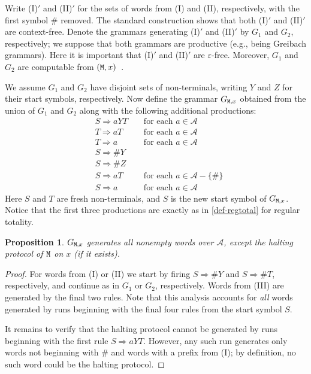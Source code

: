 \documentclass[a4paper,10pt]{amsart}
\newcommand{\TM}{\text{\rm\tt M}}
\newtheorem{proposition}[theorem]{Proposition}
\theoremstyle{definition}
\newcommand{\Alphabet}{\mathcal{A}}
\begin{document}
Write (I)$'$ and (II)$'$ for the sets of words from (I) and (II), respectively, with the first symbol $\#$ removed.
The standard construction shows that both (I)$'$ and (II)$'$ are context-free. Denote the grammars generating (I)$'$ and (II)$'$ by $G_1$ and $G_2$, respectively; we suppose that both grammars are productive (e.g., being Greibach grammars). Here it is important that (I)$'$ and (II)$'$ are $\varepsilon$-free. Moreover, $G_1$ and $G_2$ are computable from $(\TM,x)$~\cite[Section~2.1]{Kuznetsov2021TOCL}. 

We assume $G_1$ and $G_2$ have disjoint sets of non-terminals, writing $Y$ and $Z$ for their start symbols, respectively. 
Now define the grammar $G_{\TM,x}$ obtained from the union of $G_1$ and $G_2$ along with the following additional productions:
\begin{align*}
& S \Rightarrow aYT && \mbox{ for each $a \in \Alphabet$} \\
& T \Rightarrow a T && \mbox{ for each $a \in \Alphabet$} \\
& T \Rightarrow a && \mbox{ for each $a \in \Alphabet$} \\
& S \Rightarrow \# Y \\
& S \Rightarrow \# Z \\
& S \Rightarrow a T && \mbox{ for each $a \in \Alphabet - \{ \# \}$} \\
& S \Rightarrow a && \mbox{ for each $a \in \Alphabet$}
\end{align*}
Here $S$  and $T$ are fresh non-terminals, and $S$ is the new start symbol of $G_{\TM,x}$.
Notice that the first three productions are exactly as in \cref{def-regtotal} for regular totality.

\begin{proposition}
\label{grammar-generates-all-but-haltprot}
    $G_{\TM,x}$ generates all nonempty words over $\Alphabet$, except the halting protocol of $\TM$ on $x$ (if it exists).
\end{proposition}
\begin{proof}
For words from (I) or (II) we start by firing $S \Rightarrow \# Y$ and $S \Rightarrow \# T$, respectively, and continue as in $G_1$ or $G_2$, respectively. 
Words from (III) are generated by the final two rules. Note that this analysis accounts for \emph{all} words generated by runs beginning with the final four rules from the start symbol $S$.

It remains to verify that the halting protocol cannot be generated by runs beginning with the first rule $S \Rightarrow a YT$.
However, any such run generates only words not beginning with $\#$ and words with a prefix from (I); by definition, no such word could be the halting protocol.    
\end{proof}
\end{document}
